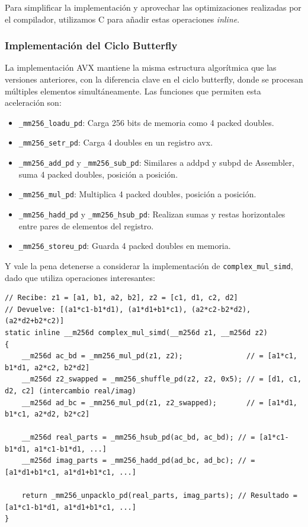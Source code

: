 \documentclass[a4paper]{article}
\begin{document}
Para simplificar la implementación y aprovechar las optimizaciones realizadas por el compilador, utilizamos C para añadir estas operaciones \textit{inline}.

\subsubsection{Implementación del Ciclo Butterfly}

La implementación AVX mantiene la misma estructura algorítmica que las versiones anteriores, con la diferencia clave en el ciclo butterfly, donde se procesan
múltiples elementos simultáneamente. Las funciones que permiten esta aceleración son:
\begin{itemize}
    \item \texttt{\_mm256\_loadu\_pd}: Carga 256 bits de memoria como 4 packed doubles.
    \item \texttt{\_mm256\_setr\_pd}: Carga 4 doubles en un registro avx.
    \item \texttt{\_mm256\_add\_pd} y \texttt{\_mm256\_sub\_pd}: Similares a addpd y subpd de Assembler, suma 4 packed doubles, posición a posición.
    \item \texttt{\_mm256\_mul\_pd}: Multiplica 4 packed doubles, posición a posición.
    \item \texttt{\_mm256\_hadd\_pd} y \texttt{\_mm256\_hsub\_pd}: Realizan sumas y restas horizontales entre pares de elementos del registro.
    \item \texttt{\_mm256\_storeu\_pd}: Guarda 4 packed doubles en memoria.
\end{itemize}

Y vale la pena detenerse a considerar la implementación de \texttt{complex\_mul\_simd}, dado que utiliza operaciones interesantes:
\begin{verbatim}
// Recibe: z1 = [a1, b1, a2, b2], z2 = [c1, d1, c2, d2]
// Devuelve: [(a1*c1-b1*d1), (a1*d1+b1*c1), (a2*c2-b2*d2), (a2*d2+b2*c2)]
static inline __m256d complex_mul_simd(__m256d z1, __m256d z2)
{
    __m256d ac_bd = _mm256_mul_pd(z1, z2);               // = [a1*c1, b1*d1, a2*c2, b2*d2]
    __m256d z2_swapped = _mm256_shuffle_pd(z2, z2, 0x5); // = [d1, c1, d2, c2] (intercambio real/imag)
    __m256d ad_bc = _mm256_mul_pd(z1, z2_swapped);       // = [a1*d1, b1*c1, a2*d2, b2*c2]

    __m256d real_parts = _mm256_hsub_pd(ac_bd, ac_bd); // = [a1*c1-b1*d1, a1*c1-b1*d1, ...]
    __m256d imag_parts = _mm256_hadd_pd(ad_bc, ad_bc); // = [a1*d1+b1*c1, a1*d1+b1*c1, ...]

    return _mm256_unpacklo_pd(real_parts, imag_parts); // Resultado = [a1*c1-b1*d1, a1*d1+b1*c1, ...]
}
\end{verbatim}
\end{document}
